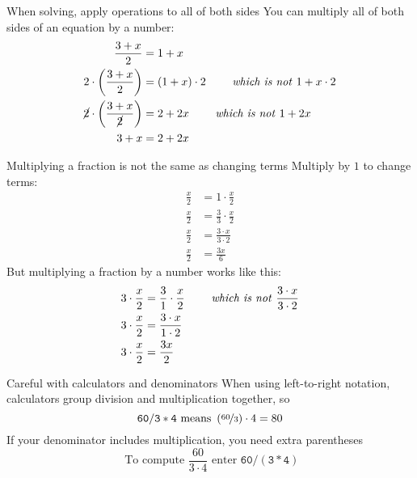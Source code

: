 \begin{WarningBox}{When solving, apply operations to all of both sides}
 You can multiply all of both sides of an equation by a number:
 \begin{equation*}
  \begin{split}
    \frac{3 + x}{2}
    &= 1 + x
    \\
    2 \cdot \left(\frac{3 + x}{2}\right)
    &= \left(1 + x\right) \cdot 2
      \qquad \text{ \emph{which is not} } 1 + x \cdot 2
    \\
    \cancel{2} \cdot \left(\frac{3 + x}{\cancel{2}}\right)
    &= 2 + 2x
      \qquad \text{ \emph{which is not} } 1 + 2x
    \\
    3 + x &= 2 + 2x
  \end{split}
 \end{equation*}
\end{WarningBox}
\begin{WarningBox}{Multiplying a fraction is not the same as changing terms}
 Multiply by $1$ to change terms:
 \begin{equation*}
  \begin{split}
    \frac{x}{2} &= 1 \cdot \frac{x}{2}
    \\
    \frac{x}{2} &= \frac{3}{3} \cdot \frac{x}{2}
    \\
    \frac{x}{2} &= \frac{3 \cdot x}{3 \cdot 2}
    \\
    \frac{x}{2} &= \frac{3x}{6}
  \end{split}
 \end{equation*}
 But multiplying a fraction by a number works like this:
 \begin{equation*}
  \begin{split}
    3 \cdot \frac{x}{2} &= \frac{3}{1} \cdot \frac{x}{2}
      \qquad \text{ \emph{which is not} } \frac{3 \cdot x}{3 \cdot 2}
    \\
    3 \cdot \frac{x}{2} &= \frac{3 \cdot x}{1 \cdot 2}
    \\
    3 \cdot \frac{x}{2} &= \frac{3x}{2}
  \end{split}
 \end{equation*}
\end{WarningBox}
\begin{WarningBox}{Careful with calculators and denominators}
 When using left-to-right notation, calculators group division and multiplication together, so
 \begin{equation*}
  \mathtt{60 / 3 * 4}
  \text{ means }
  \left(\nicefrac{60}{3}\right) \cdot 4
  = 80
 \end{equation*}
 If your denominator includes multiplication, you need extra parentheses
 \begin{equation*}
  \text{ To compute }
  \frac{60}{3 \cdot 4}
  \text{ enter }
  \mathtt{60 / (3 * 4)}
 \end{equation*}
\end{WarningBox}


